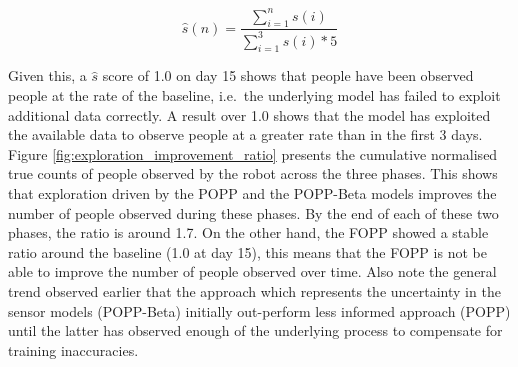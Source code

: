 \begin{equation}
	\label{eq:metric}
\hat{s}(n) = \frac{\displaystyle\sum_{i=1}^{n} s(i)}{\displaystyle\sum_{i=1}^{3} s(i) * 5}
\end{equation}

\noindent Given this, a $\hat{s}$ score of 1.0 on day 15 shows that people have been observed people at the rate of the baseline, i.e.\ the underlying model has failed to exploit additional data correctly. A result over 1.0 shows that the model has exploited the available data to observe people at a greater rate than in the first 3 days. 
% 
Figure \ref{fig:exploration_improvement_ratio} presents the cumulative normalised true counts of people observed by the robot across the three phases. This shows that exploration driven by the POPP and the POPP-Beta models improves the number of people observed during these phases. By the end of each of these two phases, the ratio is around 1.7. On the other hand, the FOPP showed a stable ratio around the baseline (1.0 at day 15), this means that the FOPP is not be able to improve the number of people observed over time. 
% 
Also note the general trend observed earlier that the approach which represents the uncertainty in the sensor models (POPP-Beta) initially out-perform less informed approach (POPP) until the latter has observed enough of the underlying process to compensate for training inaccuracies. 

